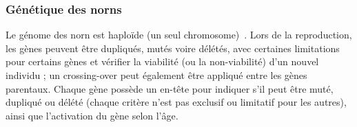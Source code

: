 \documentclass[11pt,twoside,a4paper]{article}
\begin{document}
\subsubsection{G{\'e}n{\'e}tique des norns}

Le g{\'e}nome des norn est haplo{\"i}de (un seul chromosome)~\cite{GraCli97}. Lors de la reproduction, les g{\`e}nes peuvent {\^e}tre dupliqu{\'e}s, mut{\'e}s voire d{\'e}l{\'e}t{\'e}s, avec certaines limitations pour certains g{\`e}nes et v{\'e}rifier la viabilit{\'e} (ou la non-viabilit{\'e}) d'un nouvel individu ; un crossing-over peut {\'e}galement {\^e}tre appliqu{\'e} entre les g{\`e}nes parentaux. Chaque g{\`e}ne poss{\`e}de un en-t{\^e}te pour indiquer s'il peut {\^e}tre mut{\'e}, dupliqu{\'e} ou d{\'e}l{\'e}t{\'e} (chaque crit{\`e}re n'est pas exclusif ou limitatif pour les autres), ainsi que l'activation du g{\`e}ne selon l'{\^a}ge.~\\

\end{document}
